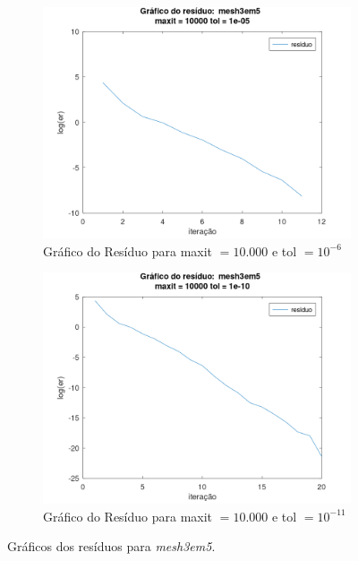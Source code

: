 \begin{figure}[H]
    \par\bigskip
    \begin{subfigure}[t]{0.36\linewidth}
         \centering
         \includegraphics[width=\textwidth]{image/mesh3em5_10000_-6.png}
         \caption{Gráfico do Resíduo para maxit $= 10.000$ e tol $=10^{-6}$}
         \label{fig:mesh-10-6}
    \end{subfigure}
    \quad
    \begin{subfigure}[t]{0.36\linewidth}
         \centering
         \includegraphics[width=\textwidth]{image/mesh3em5_10000_-11.png}
         \caption{Gráfico do Resíduo para maxit $= 10.000$ e tol $=10^{-11}$}
         \label{fig:mesh-10-11}
    \end{subfigure}
    \caption{Gráficos dos resíduos para \textit{mesh3em5}.}
    \label{fig:mesh}
\end{figure}